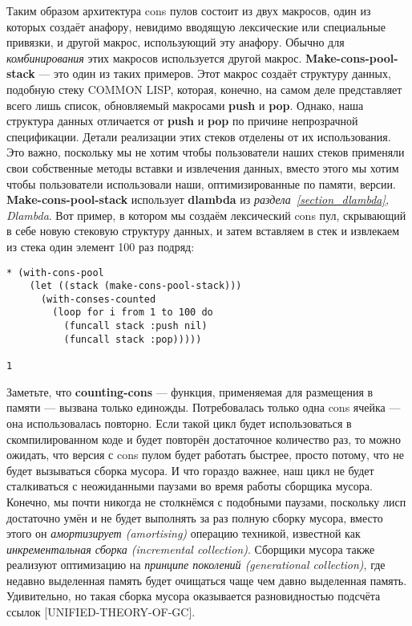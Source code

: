 Таким образом архитектура cons пулов состоит из двух макросов, один из которых создаёт анафору, невидимо вводящую лексические или специальные привязки, и другой макрос, использующий эту анафору. Обычно для \emph{комбинирования} этих макросов используется другой макрос. \textbf{Make-cons-pool-stack} --- это один из таких примеров. Этот макрос создаёт структуру данных, подобную стеку COMMON LISP, которая, конечно, на самом деле представляет всего лишь список, обновляемый макросами \textbf{push} и \textbf{pop}. Однако, наша структура данных отличается от \textbf{push} и \textbf{pop} по причине непрозрачной спецификации. Детали реализации этих стеков отделены от их использования. Это важно, поскольку мы не хотим чтобы пользователи наших стеков применяли свои собственные методы вставки и извлечения данных, вместо этого мы хотим чтобы пользователи использовали наши, оптимизированные по памяти, версии. \textbf{Make-cons-pool-stack} использует \textbf{dlambda} из \emph{раздела~\ref{section_dlambda}, Dlambda}. Вот пример, в котором мы создаём лексический cons пул, скрывающий в себе новую стековую структуру данных, и затем вставляем в стек и извлекаем из стека один элемент 100 раз подряд:

\begin{verbatim}
* (with-cons-pool
    (let ((stack (make-cons-pool-stack)))
      (with-conses-counted
        (loop for i from 1 to 100 do
          (funcall stack :push nil)
          (funcall stack :pop)))))

1
\end{verbatim}

Заметьте, что \textbf{counting-cons} --- функция, применяемая для размещения в памяти --- вызвана только единожды. Потребовалась только одна cons ячейка --- она использовалась повторно. Если такой цикл будет использоваться в скомпилированном коде и будет повторён достаточное количество раз, то можно ожидать, что версия с cons пулом будет работать быстрее, просто потому, что не будет вызываться сборка мусора. И что гораздо важнее, наш цикл не будет сталкиваться с неожиданными паузами во время работы сборщика мусора. Конечно, мы почти никогда не столкнёмся с подобными паузами, поскольку лисп достаточно умён и не будет выполнять за раз полную сборку мусора, вместо этого он \emph{амортизирует (amortising)} операцию техникой, известной как \emph{инкрементальная сборка (incremental collection)}. Сборщики мусора также реализуют оптимизацию на \emph{принципе поколений (generational collection)}, где недавно выделенная память будет очищаться чаще чем давно выделенная память. Удивительно, но такая сборка мусора оказывается разновидностью подсчёта ссылок [UNIFIED-THEORY-OF-GC].

